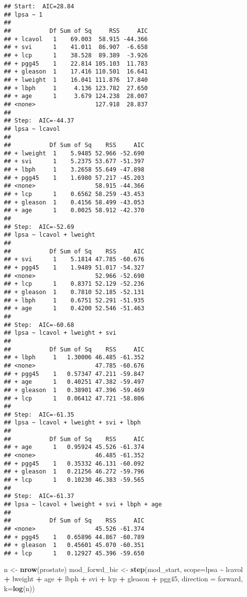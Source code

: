 \documentclass[
]{article}
\newenvironment{Shaded}{\begin{snugshade}}{\end{snugshade}}
\newcommand{\AttributeTok}[1]{\textcolor[rgb]{0.13,0.29,0.53}{#1}}
\newcommand{\FunctionTok}[1]{\textcolor[rgb]{0.13,0.29,0.53}{\textbf{#1}}}
\newcommand{\NormalTok}[1]{#1}
\newcommand{\OtherTok}[1]{\textcolor[rgb]{0.56,0.35,0.01}{#1}}
\newcommand{\SpecialCharTok}[1]{\textcolor[rgb]{0.81,0.36,0.00}{\textbf{#1}}}
\newcommand{\StringTok}[1]{\textcolor[rgb]{0.31,0.60,0.02}{#1}}
\begin{document}
\begin{enumerate}
\begin{verbatim}
## Start:  AIC=28.84
## lpsa ~ 1
## 
##           Df Sum of Sq     RSS     AIC
## + lcavol   1    69.003  58.915 -44.366
## + svi      1    41.011  86.907  -6.658
## + lcp      1    38.528  89.389  -3.926
## + pgg45    1    22.814 105.103  11.783
## + gleason  1    17.416 110.501  16.641
## + lweight  1    16.041 111.876  17.840
## + lbph     1     4.136 123.782  27.650
## + age      1     3.679 124.238  28.007
## <none>                 127.918  28.837
## 
## Step:  AIC=-44.37
## lpsa ~ lcavol
## 
##           Df Sum of Sq    RSS     AIC
## + lweight  1    5.9485 52.966 -52.690
## + svi      1    5.2375 53.677 -51.397
## + lbph     1    3.2658 55.649 -47.898
## + pgg45    1    1.6980 57.217 -45.203
## <none>                 58.915 -44.366
## + lcp      1    0.6562 58.259 -43.453
## + gleason  1    0.4156 58.499 -43.053
## + age      1    0.0025 58.912 -42.370
## 
## Step:  AIC=-52.69
## lpsa ~ lcavol + lweight
## 
##           Df Sum of Sq    RSS     AIC
## + svi      1    5.1814 47.785 -60.676
## + pgg45    1    1.9489 51.017 -54.327
## <none>                 52.966 -52.690
## + lcp      1    0.8371 52.129 -52.236
## + gleason  1    0.7810 52.185 -52.131
## + lbph     1    0.6751 52.291 -51.935
## + age      1    0.4200 52.546 -51.463
## 
## Step:  AIC=-60.68
## lpsa ~ lcavol + lweight + svi
## 
##           Df Sum of Sq    RSS     AIC
## + lbph     1   1.30006 46.485 -61.352
## <none>                 47.785 -60.676
## + pgg45    1   0.57347 47.211 -59.847
## + age      1   0.40251 47.382 -59.497
## + gleason  1   0.38901 47.396 -59.469
## + lcp      1   0.06412 47.721 -58.806
## 
## Step:  AIC=-61.35
## lpsa ~ lcavol + lweight + svi + lbph
## 
##           Df Sum of Sq    RSS     AIC
## + age      1   0.95924 45.526 -61.374
## <none>                 46.485 -61.352
## + pgg45    1   0.35332 46.131 -60.092
## + gleason  1   0.21256 46.272 -59.796
## + lcp      1   0.10230 46.383 -59.565
## 
## Step:  AIC=-61.37
## lpsa ~ lcavol + lweight + svi + lbph + age
## 
##           Df Sum of Sq    RSS     AIC
## <none>                 45.526 -61.374
## + pgg45    1   0.65896 44.867 -60.789
## + gleason  1   0.45601 45.070 -60.351
## + lcp      1   0.12927 45.396 -59.650
\end{verbatim}

\begin{Shaded}
\begin{Highlighting}[]
\NormalTok{n }\OtherTok{\textless{}{-}} \FunctionTok{nrow}\NormalTok{(prostate)}
\NormalTok{mod\_forwd\_bic }\OtherTok{\textless{}{-}} \FunctionTok{step}\NormalTok{(mod\_start, }\AttributeTok{scope=}\NormalTok{lpsa }\SpecialCharTok{\textasciitilde{}}\NormalTok{ lcavol }\SpecialCharTok{+}\NormalTok{ lweight }\SpecialCharTok{+}\NormalTok{ age }\SpecialCharTok{+}\NormalTok{ lbph }\SpecialCharTok{+}\NormalTok{ svi }\SpecialCharTok{+}\NormalTok{ lcp }\SpecialCharTok{+}\NormalTok{ gleason }\SpecialCharTok{+}\NormalTok{ pgg45, }\AttributeTok{direction =} \StringTok{\textquotesingle{}forward\textquotesingle{}}\NormalTok{, }\AttributeTok{k=}\FunctionTok{log}\NormalTok{(n))}
\end{Highlighting}
\end{Shaded}


\end{enumerate}
\end{document}
